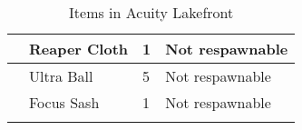 \begin{longtable}{|| l l l l ||}%
\hline%
&Reaper Cloth&1&Not respawnable\\%
\hline%
&Ultra Ball&5&Not respawnable\\%
\hline%
&Focus Sash&1&Not respawnable\\%
\hline%
\endhead%
\hline%
\caption{Items in Acuity Lakefront}%
\label{tab:AcuityLakefrontItems}%
\end{longtable}
